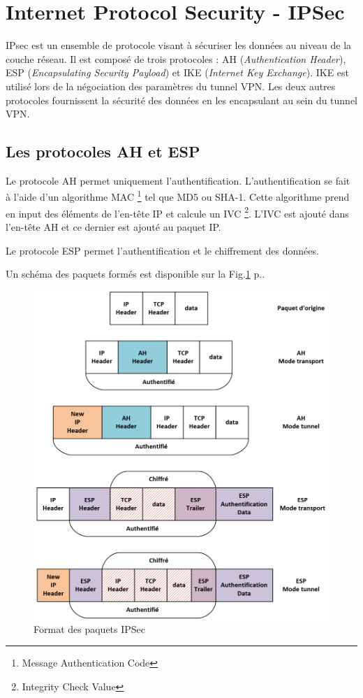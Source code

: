 \section{Internet Protocol Security - IPSec}
IPsec est un ensemble de protocole visant à sécuriser les données au niveau de la couche réseau. 
Il est composé de trois protocoles : AH (\textit{Authentication Header}), ESP (\textit{Encapsulating Security Payload}) et IKE (\textit{Internet Key Exchange}).
IKE est utilisé lors de la négociation des paramètres du tunnel VPN. 
Les deux autres protocoles fournissent la sécurité des données en les encapsulant au sein du tunnel VPN. 

\subsection{Les protocoles AH et ESP}
Le protocole AH permet uniquement l'authentification. 
L'authentification se fait à l'aide d'un algorithme MAC \footnote{Message Authentication Code} tel que MD5 ou SHA-1.
Cette algorithme prend en input des éléments de l'en-tête IP et calcule un IVC \footnote{Integrity Check Value}.
L'IVC est ajouté dans l'en-tête AH et ce dernier est ajouté au paquet IP.

Le protocole ESP permet l'authentification et le chiffrement des données.

Un schéma des paquets formés est disponible sur la Fig.\ref{fig:ipsecHead} p.\pageref{fig:ipsecHead}.

\begin{figure}
	\centering
	\includegraphics[width=16cm]{techno/IPSec-AH-ESP}
	\caption{Format des paquets IPSec}
	\label{fig:ipsecHead}
\end{figure}

